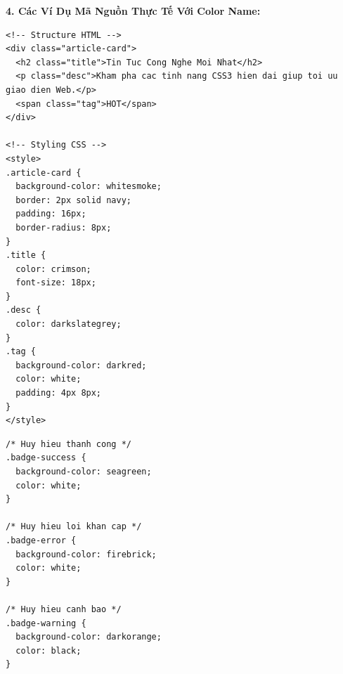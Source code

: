 \textbf{4. Các Ví Dụ Mã Nguồn Thực Tế Với Color Name:}

\begin{codeWindow}
\begin{lstlisting}[language=HTML5]
<!-- Structure HTML -->
<div class="article-card">
  <h2 class="title">Tin Tuc Cong Nghe Moi Nhat</h2>
  <p class="desc">Kham pha cac tinh nang CSS3 hien dai giup toi uu giao dien Web.</p>
  <span class="tag">HOT</span>
</div>

<!-- Styling CSS -->
<style>
.article-card {
  background-color: whitesmoke;
  border: 2px solid navy;
  padding: 16px;
  border-radius: 8px;
}
.title {
  color: crimson;
  font-size: 18px;
}
.desc {
  color: darkslategrey;
}
.tag {
  background-color: darkred;
  color: white;
  padding: 4px 8px;
}
</style>
\end{lstlisting}
\end{codeWindow}

\begin{codeWindow}
\begin{lstlisting}[language=CSS3]
/* Huy hieu thanh cong */
.badge-success {
  background-color: seagreen;
  color: white;
}

/* Huy hieu loi khan cap */
.badge-error {
  background-color: firebrick;
  color: white;
}

/* Huy hieu canh bao */
.badge-warning {
  background-color: darkorange;
  color: black;
}
\end{lstlisting}
\end{codeWindow}

